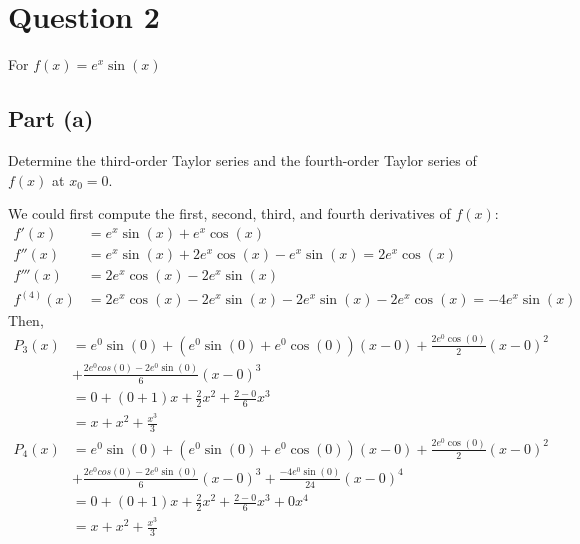 \section{Question 2}

\begin{question}
    For $f(x) = e^x \sin{(x)}$
\end{question}

\subsection{Part (a)}

\begin{question}
    Determine the third-order Taylor series and the fourth-order Taylor series of $f(x)$ at $x_0 = 0$.
\end{question}

\begin{answer}
    We could first compute the first, second, third, and fourth derivatives of $f(x)$:
    \begin{align}
        f'(x) & = e^x\sin{(x)} + e^x\cos{(x)}\\
        f''(x) & = e^x\sin{(x)} + 2e^x\cos{(x)} - e^x\sin{(x)} = 2e^x\cos{(x)}\\
        f'''(x) & = 2e^x\cos{(x)} - 2e^x\sin{(x)}\\
        f^{(4)}(x) & = 2e^x\cos{(x)} - 2e^x\sin{(x)} - 2e^x\sin{(x)} - 2e^x\cos{(x)} = -4e^x\sin{(x)}
    \end{align}
    Then,
    \begin{equation}
        \begin{aligned}
        P_{3}(x) & = e^0\sin{(0)} + (e^0\sin{(0)} + e^0\cos{(0)})(x-0) + \tfrac{2e^0\cos{(0)}}{2}(x-0)^2\\
        &+ \tfrac{2e^0cos{(0)} - 2e^0\sin{(0)}}{6}(x-0)^3\\
        & = 0 + (0 + 1)x + \tfrac{2}{2}x^2 + \tfrac{2 - 0}{6}x^3\\
        &= x + x^2 + \tfrac{x^3}{3}
        \end{aligned}
    \end{equation}
    \begin{equation}
        \begin{aligned}
        P_{4}(x) & = e^0\sin{(0)} + (e^0\sin{(0)} + e^0\cos{(0)})(x-0) + \tfrac{2e^0\cos{(0)}}{2}(x-0)^2\\
        &+ \tfrac{2e^0cos{(0)} - 2e^0\sin{(0)}}{6}(x-0)^3 + \tfrac{-4e^0\sin{(0)}}{24}(x-0)^4\\
        & = 0 + (0 + 1)x + \tfrac{2}{2}x^2 + \tfrac{2 - 0}{6}x^3 + 0x^4\\
        & = x + x^2 + \tfrac{x^3}{3}
        \end{aligned}
    \end{equation}
\end{answer}

